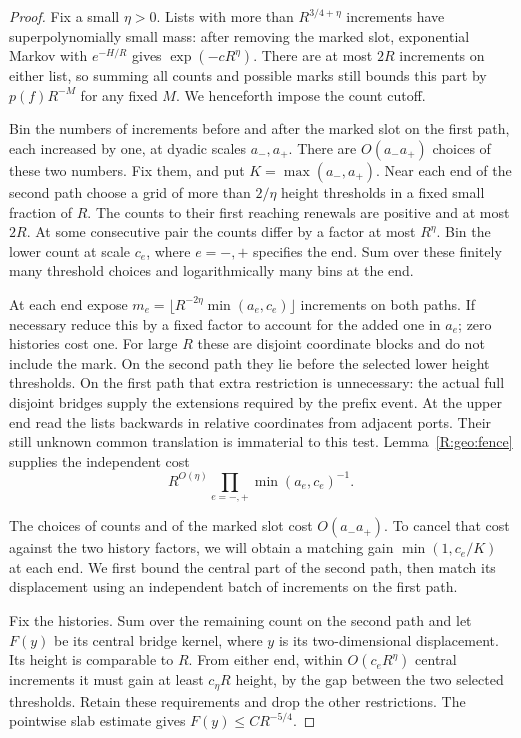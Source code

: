 \begin{proof}
Fix a small $\eta>0$.  Lists with more than $R^{3/4+\eta}$ increments
have superpolynomially small mass: after removing the marked slot,
exponential Markov with $e^{-H/R}$ gives $\exp(-cR^\eta)$.
There are at most $2R$ increments on either list, so summing all counts
and possible marks still bounds this part by $p(f)R^{-M}$ for any
fixed $M$.  We henceforth impose the count cutoff.

Bin the numbers of increments before and after the marked slot on the
first path, each increased by one, at dyadic scales $a_-,a_+$.
There are $O(a_-a_+)$ choices of these two numbers.  Fix them, and put
$K=\max(a_-,a_+)$.  Near each end of the second path choose a grid
of more than $2/\eta$ height thresholds in a fixed small fraction of
$R$.  The counts to their first reaching renewals are positive and at
most $2R$.  At some consecutive pair the counts differ by a factor at
most $R^\eta$.  Bin the lower count at scale $c_e$, where $e=-,+$
specifies the end.  Sum over these finitely many threshold choices and
logarithmically many bins at the end.

At each end expose $m_e=\lfloor R^{-2\eta}\min(a_e,c_e)\rfloor$
increments on both paths.  If necessary reduce this by a fixed factor
to account for the added one in $a_e$; zero histories cost one.  For
large $R$ these are disjoint coordinate blocks and do not include the
mark.  On the second path they lie before the selected lower height
thresholds.  On the first path that extra restriction is unnecessary:
the actual full disjoint bridges supply the extensions required by
the prefix event.  At the
upper end read the lists backwards in relative coordinates from
adjacent ports.  Their still unknown common translation is immaterial
to this test.  Lemma~\ref{R:geo:fence} supplies the independent cost
\begin{equation}\label{R:geo:end-costs}
 R^{O(\eta)}\prod_{e=-,+}\min(a_e,c_e)^{-1}.
\end{equation}

The choices of counts and of the marked slot cost $O(a_-a_+)$.  To
cancel that cost against the two history factors, we will obtain a
matching gain $\min(1,c_e/K)$ at each end.  We first bound the central
part of the second path, then match its displacement using an independent
batch of increments on the first path.

Fix the histories.  Sum over the remaining count on the second path
and let $F(y)$ be its central bridge kernel, where $y$ is its two-dimensional
displacement.  Its height is comparable to $R$.  From either end,
within $O(c_eR^\eta)$ central increments it must gain at least
$c_\eta R$ height, by the gap between the two selected thresholds.
Retain these requirements and drop the other restrictions.  The
pointwise slab estimate gives $F(y)\le CR^{-5/4}$.


\end{proof}
